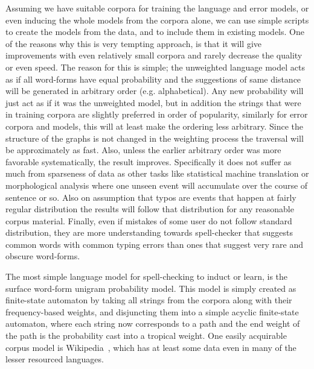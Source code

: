 \documentclass[a4paper,12pt]{article}
\begin{document}
Assuming we have suitable corpora for training the language and error models,
or even inducing the whole models from the corpora alone, we can use simple
scripts to create the models from the data, and to include them in existing
models. One of the reasons why this is very tempting approach, is that it will
give improvements with even relatively small corpora and rarely decrease the
quality or even speed. The reason for this is simple; the unweighted language
model acts as if all word-forms have equal probability and the suggestions of
same distance will be generated in arbitrary order (e.g. alphabetical). Any new
probability will just act as if it was the unweighted model, but in addition
the strings that were in training corpora are slightly preferred in order of
popularity, similarly for error corpora and models, this will at least make the
ordering less arbitrary. Since the structure of the graphs is not changed in
the weighting process the traversal will be approximately as fast. Also,
unless the earlier arbitrary order was more
favorable systematically, the result improves. Specifically it does not suffer
as much from sparseness of data as other tasks like statistical machine
translation or morphological analysis where one unseen event will accumulate
over the course of sentence or so. Also on assumption that typos are events
that happen at fairly regular distribution the results will follow that
distribution for any reasonable corpus material. Finally, even if mistakes of
some user do not follow standard distribution, they are more understanding
towards spell-checker that suggests common words with common typing errors than
ones that suggest very rare and obscure word-forms.

The most simple language model for spell-checking to induct or learn, is the
surface word-form unigram probability model. This model is simply created as
finite-state automaton by taking all strings from the corpora along with their
frequency-based weights, and disjuncting them into a simple acyclic
finite-state automaton, where each string now corresponds to a path and the end
weight of the path is the probability cast into a tropical weight. One easily
acquirable corpus model is Wikipedia~\cite[]{pirinen/2010/lrec}, which has
at least some data even in many of the lesser resourced languages.
\end{document}
